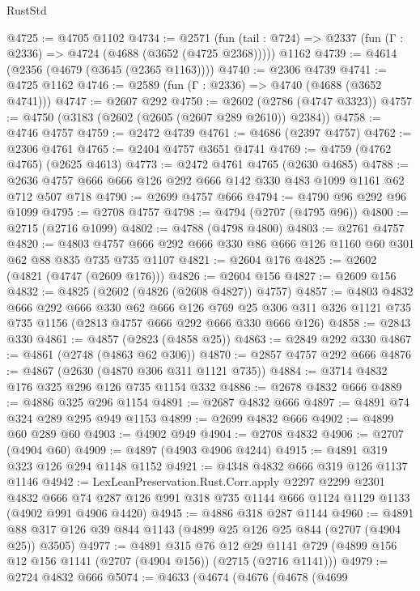 \begin{lexlean}{RustStd}
\begin{coremodule}
@4725 := @4705 @1102
@4734 := @2571
    (fun (tail : @724) => @2337 (fun (Γ : @2336) => @4724 (@4688 (@3652 (@4725 @2368)))))
    @1162
@4739 := @4614 (@2356 (@4679 (@3645 (@2365 @1163))))
@4740 := @2306 @4739
@4741 := @4725 @1162
@4746 := @2589 (fun (Γ : @2336) => @4740 (@4688 (@3652 @4741)))
@4747 := @2607 @292
@4750 := @2602 (@2786 (@4747 @3323))
@4757 := @4750 (@3183 (@2602 (@2605 (@2607 @289 @2610)) @2384))
@4758 := @4746 @4757
@4759 := @2472 @4739
@4761 := @4686 (@2397 @4757)
@4762 := @2306 @4761
@4765 := @2404 @4757 @3651 @4741
@4769 := @4759 (@4762 @4765) (@2625 @4613)
@4773 := @2472 @4761 @4765 (@2630 @4685)
@4788 := @2636 @4757 @666 @666 @126 @292 @666 @142 @330 @483 @1099 @1161 @62 @712 @507 @718
@4790 := @2699 @4757 @666
@4794 := @4790 @96 @292 @96 @1099
@4795 := @2708 @4757
@4798 := @4794 (@2707 (@4795 @96))
@4800 := @2715 (@2716 @1099)
@4802 := @4788 (@4798 @4800)
@4803 := @2761 @4757
@4820 := @4803 @4757 @666 @292 @666 @330 @86 @666 @126 @1160 @60 @301 @62 @88 @835 @735 @735 @1107
@4821 := @2604 @176
@4825 := @2602 (@4821 (@4747 (@2609 @176)))
@4826 := @2604 @156
@4827 := @2609 @156
@4832 := @4825 (@2602 (@4826 (@2608 @4827)) @4757)
@4857 := @4803
    @4832
    @666
    @292
    @666
    @330
    @62
    @666
    @126
    @769
    @25
    @306
    @311
    @326
    @1121
    @735
    @735
    @1156
    (@2813 @4757 @666 @292 @666 @330 @666 @126)
@4858 := @2843 @330
@4861 := @4857 (@2823 (@4858 @25))
@4863 := @2849 @292 @330
@4867 := @4861 (@2748 (@4863 @62 @306))
@4870 := @2857 @4757 @292 @666
@4876 := @4867 (@2630 (@4870 @306 @311 @1121 @735))
@4884 := @3714 @4832 @176 @325 @296 @126 @735 @1154 @332
@4886 := @2678 @4832 @666
@4889 := @4886 @325 @296 @1154
@4891 := @2687 @4832 @666
@4897 := @4891 @74 @324 @289 @295 @949 @1153
@4899 := @2699 @4832 @666
@4902 := @4899 @60 @289 @60
@4903 := @4902 @949
@4904 := @2708 @4832
@4906 := @2707 (@4904 @60)
@4909 := @4897 (@4903 @4906 @4244)
@4915 := @4891 @319 @323 @126 @294 @1148 @1152
@4921 := @4348 @4832 @666 @319 @126 @1137 @1146
@4942 := LexLeanPreservation.Rust.Corr.apply
    @2297
    @2299
    @2301
    @4832
    @666
    @74
    @287
    @126
    @991
    @318
    @735
    @1144
    @666
    @1124
    @1129
    @1133
    (@4902 @991 @4906 @4420)
@4945 := @4886 @318 @287 @1144
@4960 := @4891 @88 @317 @126 @39 @844 @1143 (@4899 @25 @126 @25 @844 (@2707 (@4904 @25)) @3505)
@4977 := @4891
    @315
    @76
    @12
    @29
    @1141
    @729
    (@4899 @156 @12 @156 @1141 (@2707 (@4904 @156)) (@2715 (@2716 @1141)))
@4979 := @2724 @4832 @666
@5074 := @4633
    (@4674
      (@4676
        (@4678
          (@4699

\end{coremodule}
\end{lexlean}
